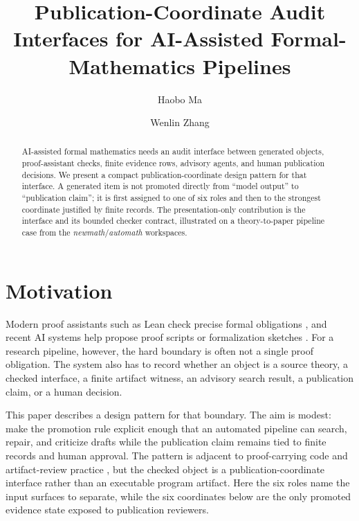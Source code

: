 \documentclass[runningheads]{llncs}
\title{Publication-Coordinate Audit Interfaces for AI-Assisted Formal-Mathematics Pipelines}
\author{Haobo Ma\inst{1} \and Wenlin Zhang\inst{2}}
\institute{AELF PTE LTD. \email{auric@aelf.io} \and
National University of Singapore \email{e1327962@u.nus.edu}}
\begin{document}
\maketitle

\begin{abstract}
AI-assisted formal mathematics needs an audit interface between generated
objects, proof-assistant checks, finite evidence rows, advisory agents, and
human publication decisions.  We present a compact publication-coordinate design
pattern for that interface.  A generated item is not promoted directly from
``model output'' to ``publication claim''; it is first assigned to one of six
roles and then to the strongest coordinate justified by finite records.  The
presentation-only contribution is the interface and its bounded checker
contract, illustrated on a theory-to-paper pipeline case from the
\emph{newmath}/\emph{automath} workspaces.
\end{abstract}

\section{Motivation}

Modern proof assistants such as Lean check precise formal obligations
\cite{deMouraKADR2015Lean}, and recent AI systems help propose proof scripts or
formalization sketches \cite{YangEtAl2023LeanDojo,HorowitzEtAl2026Herald}.
For a research pipeline, however, the hard boundary is often not a single proof
obligation.  The system also has to record whether an object is a source theory,
a checked interface, a finite artifact witness, an advisory search result, a
publication claim, or a human decision.

This paper describes a design pattern for that boundary.  The aim is modest:
make the promotion rule explicit enough that an automated pipeline can search,
repair, and criticize drafts while the publication claim remains tied to finite
records and human approval.  The pattern is adjacent to proof-carrying code
\cite{Necula1997PCC} and artifact-review practice
\cite{ACM2020ArtifactBadging,ChirigatiRampinShashaFreire2016ReproZip}, but the
checked object is a publication-coordinate interface rather than an executable
program artifact.
Here the six roles name the input surfaces to separate, while the six
coordinates below are the only promoted evidence state exposed to publication
reviewers.
\end{document}
